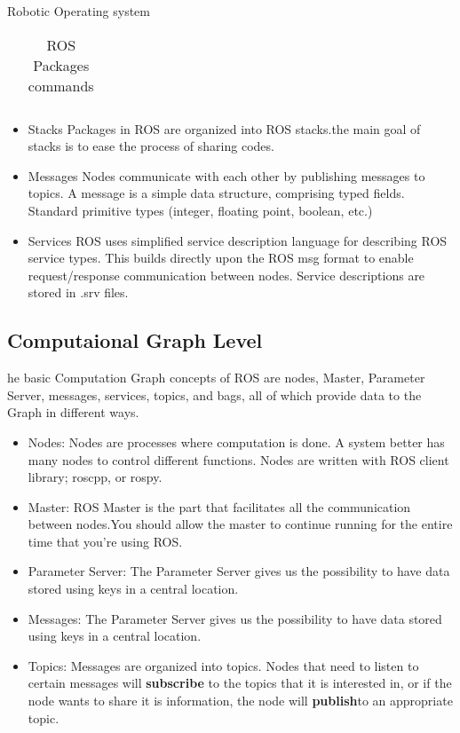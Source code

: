 \documentclass[a4paper]{book}
\begin{document}
\begin{chapter}{Robotic Operating system}
\begin{itemize}
\begin{table}[h!]
\begin{tabular}{| p{4cm} |p{7cm}|}
  		\end{tabular}
  		\caption{ROS Packages commands}
  		\label{table:1}
  	\end{table}
 \item Stacks
 \newline
 Packages in ROS are organized into ROS stacks.the main goal of stacks is to ease the process of sharing codes.
 \item Messages
 \newline
 Nodes communicate with each other by publishing messages to topics. A message is a simple data structure, comprising typed fields. Standard primitive types (integer, floating point, boolean, etc.)
 \item Services
 \newline
 ROS uses simplified service description language for describing ROS service types. This builds directly upon the ROS msg format to enable request/response communication between nodes. Service descriptions are stored in .srv files. 
  	
\end{itemize}
\subsection{Computaional Graph Level}
he basic Computation Graph concepts of ROS are nodes, Master, Parameter Server, messages, services, topics, and bags, all of which provide data to the Graph in different ways.
\begin{itemize}
	\item Nodes: Nodes are processes where computation is done. A system better has many nodes to control different functions. Nodes are written with ROS client library; roscpp, or rospy.
	\item Master: ROS Master is the part that facilitates all the communication between nodes.You should allow the master to continue running for the entire time that you’re using ROS.
	\item Parameter Server: The Parameter Server gives us the possibility to have data stored using keys in a central location.
	\item  Messages: The Parameter Server gives us the possibility to have data stored using keys in a central location.
	\item Topics: Messages are organized into topics. Nodes that need to listen to certain messages will \textbf{subscribe} to the topics that it is interested in, or if the node wants to share it is information, the node will \textbf{publish}to an appropriate topic.
	


\end{itemize}
\end{chapter}
\end{document}
